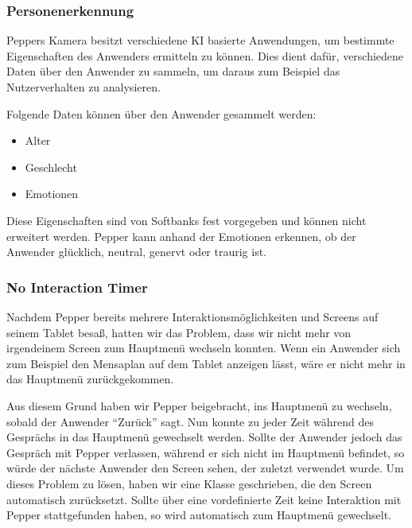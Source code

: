 \subsubsection{Personenerkennung}

Peppers Kamera besitzt verschiedene KI basierte Anwendungen, um bestimmte Eigenschaften des Anwenders ermitteln zu können. Dies dient dafür, verschiedene 
Daten über den Anwender zu sammeln, um daraus zum Beispiel das Nutzerverhalten zu analysieren.

Folgende Daten können über den Anwender gesammelt werden:
\begin{itemize}
\item Alter
\item Geschlecht
\item Emotionen
\end{itemize}

Diese Eigenschaften sind von Softbanks fest vorgegeben und können nicht erweitert werden. Pepper kann anhand der Emotionen erkennen, ob der Anwender 
glücklich, neutral, genervt oder traurig ist.\\

\subsubsection{No Interaction Timer}

Nachdem Pepper bereits mehrere Interaktionsmöglichkeiten und Screens auf seinem Tablet besaß, hatten wir das Problem, dass wir nicht mehr von 
irgendeinem Screen zum Hauptmenü wechseln konnten. Wenn ein Anwender sich zum Beispiel den Mensaplan auf dem Tablet anzeigen lässt, wäre er nicht 
mehr in das Hauptmenü zurückgekommen. 

Aus diesem Grund haben wir Pepper beigebracht, ins Hauptmenü zu wechseln, sobald der Anwender ``Zurück'' sagt. Nun konnte zu jeder Zeit 
während des Gesprächs in das Hauptmenü gewechselt werden. Sollte der Anwender jedoch das Gespräch mit Pepper verlassen, während er sich nicht im 
Hauptmenü befindet, so würde der nächste Anwender den Screen sehen, der zuletzt verwendet wurde. 
Um dieses Problem zu lösen, haben wir eine Klasse geschrieben, die den Screen automatisch zurücksetzt.
Sollte über eine vordefinierte Zeit keine Interaktion mit Pepper stattgefunden haben, so wird automatisch zum Hauptmenü gewechselt.